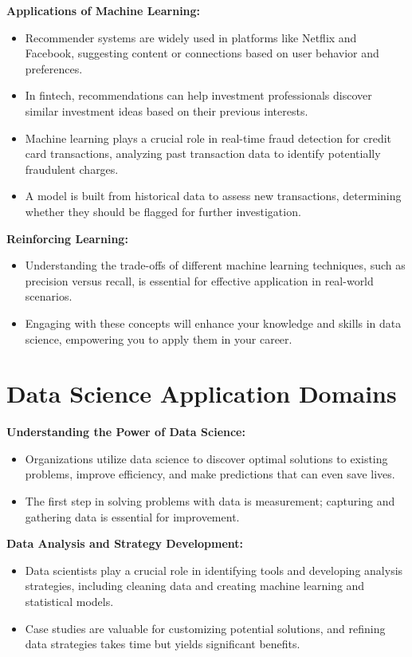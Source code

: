 \documentclass[12pt]{report} %
\begin{document}
		\noindent \textbf{Applications of Machine Learning:}
		\begin{itemize}
			\item Recommender systems are widely used in platforms like Netflix and Facebook, suggesting content or connections based on user behavior and preferences.
			\item In fintech, recommendations can help investment professionals discover similar investment ideas based on their previous interests.
			\item Machine learning plays a crucial role in real-time fraud detection for credit card transactions, analyzing past transaction data to identify potentially fraudulent charges.
			\item A model is built from historical data to assess new transactions, determining whether they should be flagged for further investigation.
		\end{itemize}
		
		\noindent \textbf{Reinforcing Learning:}
		\begin{itemize}
			\item Understanding the trade-offs of different machine learning techniques, such as precision versus recall, is essential for effective application in real-world scenarios.
			\item Engaging with these concepts will enhance your knowledge and skills in data science, empowering you to apply them in your career.
		\end{itemize}
			

		\section{Data Science Application Domains}
		
		\noindent \textbf{Understanding the Power of Data Science:}
		\begin{itemize}
			\item Organizations utilize data science to discover optimal solutions to existing problems, improve efficiency, and make predictions that can even save lives.
			\item The first step in solving problems with data is measurement; capturing and gathering data is essential for improvement.
		\end{itemize}
	
		\noindent \textbf{Data Analysis and Strategy Development:}
		\begin{itemize}
			\item Data scientists play a crucial role in identifying tools and developing analysis strategies, including cleaning data and creating machine learning and statistical models.
			\item Case studies are valuable for customizing potential solutions, and refining data strategies takes time but yields significant benefits.
		\end{itemize}
\end{document}
